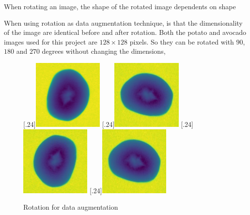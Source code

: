 \documentclass[11pt]{article}
\begin{document}
When rotating an image, the shape of the rotated image dependents on  shape 


When using rotation as data augmentation technique, is that the dimensionality of the image are identical before and after rotation. Both the potato and avocado images used for this project are $128 \times 128$ pixels. So they can be rotated with $90$, $180$ and $270$ degrees without changing the dimensions,

\begin{figure}[H]
\centering
{}
  [.24\textwidth]{\includegraphics[height=3.5cm]{figurer/hollow_15.jpg}}
  [.24\textwidth]{\includegraphics[height=3.5cm]{figurer/hollow_15_90.jpg}}
  [.24\textwidth]{\includegraphics[height=3.5cm]{figurer/hollow_15_180.jpg}}
  [.24\textwidth]{\includegraphics[height=3.5cm]{figurer/hollow_15_270.jpg}}
 \caption{Rotation for data augmentation}
 \label{fig:data_augmentation_rotation}
\end{figure}
\end{document}
